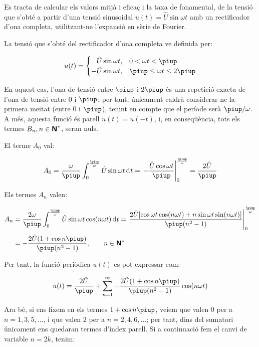 	
\begin{exemple}[\ValorMitjaEfTaxaFon{}]
	\addcontentsxms{\ValorMitjaEfTaxaFon}
    Es tracta de calcular els valors mitjà i eficaç i la taxa de
    fonamental, de la tensió que s'obté a partir d'una tensió
    sinusoidal $u(t) = \hat{U} \sin\omega t$ amb un rectificador d'ona
    completa, utilitzant-ne l'expansió en sèrie de Fourier.

    La tensió que s'obté del rectificador d'ona completa ve definida
    per:

    \[
    u(t) = \begin{cases} \phantom{-}\hat{U} \sin\omega t, & 0 < \omega t < \piup\\
           -\hat{U} \sin\omega t, & \piup \leq \omega t \leq 2\piup \end{cases}
    \]

    En aquest cas, l'ona de tensió entre $\piup$ i $2\piup$ és una repetició
    exacta de l'ona de tensió entre 0 i $\piup$; per tant, únicament
    caldrà considerar-ne la primera meitat (entre 0 i $\piup$), tenint en
    compte que el període serà $\piup/\omega$. A més, aquesta funció és
    parell $u(t) = u(-t)$, i, en conseqüència, tots els termes
    $B_n, n \in {\ensuremath{\boldsymbol{\mathsf{N}}}}^*$, seran nuls.

    El terme $A_0$ val:

    \[
    A_0 = \frac{\omega}{\piup} \int_0^{\frac{\piup}{\omega}} \hat{U} \sin
    \omega t \diff t = \left. -\frac{\hat{U} \cos \omega t}{\piup}
    \right|_0^{\frac{\piup}{\omega}} = \frac{2\hat{U}}{\piup}
    \]

    Els termes $A_n$ valen:

    \[
    \begin{split}
    A_n &= \frac{2 \omega}{\piup} \int_0^{\frac{\piup}{\omega}} \hat{U} \sin
    \omega t \cos(n \omega t)\diff t = \left. \frac{2 \hat{U}[ \cos
    \omega t \cos (n \omega t) + n \sin \omega t \sin(n \omega
    t)]}{\piup(n^2-1)} \right|_0^{\frac{\piup}{\omega}}\\[0.5ex]
    &= -\frac{2\hat{U}(1+\cos n \piup)}{\piup(n^2-1)},
    \qquad n \in \mathsfb{N}^*
    \end{split}
    \]

    Per tant, la funció periòdica $u(t)$ es pot expressar com:

    \[
        u(t) = \frac{2\hat{U}}{\piup} + \sum_{n=1}^\infty
         - \frac{2\hat{U}(1+\cos n \piup)}{\piup(n^2-1)} \cos(n \omega t)
    \]

    Ara bé, si ens fixem en els termes $1+\cos n \piup$, veiem que valen 0
    per a $n=1,3,5,\ldots$, i que valen 2 per a $n=2,4,6,\ldots$; per tant, dins
    del sumatori únicament ens quedaran termes d'índex parell. Si a
    continuació fem el canvi de variable $n=2k$, tenim:


\end{exemple}

